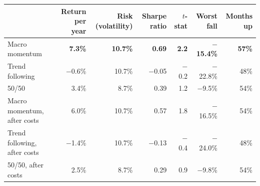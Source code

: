 \begin{tabular}{l rrrrrr}
\toprule
 & Return per year & Risk (volatility) & Sharpe ratio & $t$-stat & Worst fall & Months up \\
\midrule
Macro momentum & \textbf{7.3\%} & \textbf{10.7\%} & \textbf{0.69} & \textbf{2.2} & \textbf{$-$15.4\%} & \textbf{57\%} \\
Trend following & $-$0.6\% & 10.7\% & $-$0.05 & $-$0.2 & $-$22.8\% & 48\% \\
50/50 & 3.4\% & 8.7\% & 0.39 & 1.2 & $-$9.5\% & 54\% \\
\midrule
Macro momentum, after costs & 6.0\% & 10.7\% & 0.57 & 1.8 & $-$16.5\% & 54\% \\
Trend following, after costs & $-$1.4\% & 10.7\% & $-$0.13 & $-$0.4 & $-$24.0\% & 48\% \\
50/50, after costs & 2.5\% & 8.7\% & 0.29 & 0.9 & $-$9.8\% & 54\% \\
\bottomrule
\end{tabular}
